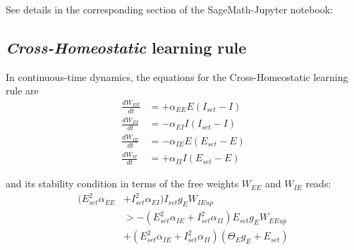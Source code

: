 \documentclass[twocolumn]{article}
\newcommand{\EE}{\mathit{EE}}
\newcommand{\EI}{\mathit{EI}}
\newcommand{\IE}{\mathit{IE}}
\newcommand{\II}{\mathit{II}}
\newcommand{\set}{\mathit{set}}
\newcommand{\up}{\mathit{up}}
\begin{document}
See details in the corresponding section of the SageMath-Jupyter notebook:






\subsection{{\em Cross-Homeostatic} learning rule}

In continuous-time dynamics, the equations for the Cross-Homeostatic learning rule are
\begin{equation}
\begin{aligned}
\frac{dW_{\EE}}{dt} & = +\alpha_{\EE} E (I_{\set} - I) \\
\frac{dW_{\EI}}{dt} & = -\alpha_{\EI} I (I_{\set} - I) \\
\frac{dW_{\IE}}{dt} & = -\alpha_{\IE} E (E_{\set} - E) \\
\frac{dW_{\II}}{dt} & = +\alpha_{\II} I (E_{\set} - E)
\end{aligned}
\label{eq.CH_equation}
\end{equation}

\noindent and its stability condition in terms of the free weights $W_{\EE}$ and $W_{\IE}$ reads:
\begin{equation}
\begin{aligned}
(E_{\set}^2 \alpha_{\EE} & + I_{\set}^2 \alpha_{\EI}) I_{\set} g_E W_{\IE\up} \\
& >
-(E_{\set}^2 \alpha_{\IE} + I_{\set}^2 \alpha_{\II}) E_{\set} g_E W_{\EE\up} \\
& +
(E_{\set}^2 \alpha_{\IE} + I_{\set}^2 \alpha_{\II}) (\Theta_E g_E + E_{\set})
\end{aligned}
\label{eq.CH_stable_cond_v1}
\end{equation}
\end{document}
